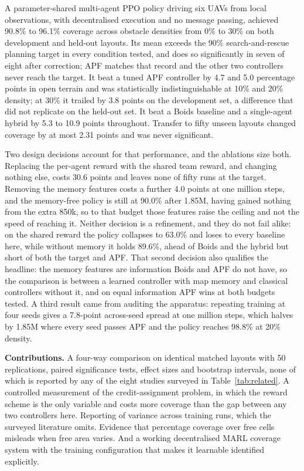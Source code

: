 \documentclass[a4paper, 10pt, conference]{ieeeconf}
\begin{document}
A parameter-shared multi-agent PPO policy driving six UAVs from local
observations, with decentralised execution and no message passing,
achieved 90.8\% to 96.1\% coverage across obstacle densities from 0\%
to 30\% on both development and held-out layouts. Its mean exceeds the
90\% search-and-rescue planning target in every condition tested, and
does so significantly in seven of eight after correction; APF matches
that record and the other two controllers never reach the target. It
beat a tuned APF controller by 4.7 and 5.0 percentage points in open
terrain and was statistically indistinguishable at 10\% and 20\%
density; at 30\% it trailed by 3.8 points on the development set, a
difference that did not replicate on the held-out set. It beat a Boids
baseline and a single-agent hybrid by 5.3 to 10.9 points throughout.
Transfer to fifty unseen layouts changed coverage by at most 2.31
points and was never significant.

Two design decisions account for that performance, and the ablations
size both. Replacing the per-agent reward with the shared team reward,
and changing nothing else, costs 30.6 points and leaves none of fifty
runs at the target. Removing the memory features costs a further 4.0
points at one million steps, and the memory-free policy is still at
90.0\% after 1.85M, having gained nothing from the extra 850k, so to
that budget those features raise the ceiling and not the speed of
reaching it. Neither decision is a refinement, and they do not fail
alike: on the shared reward the policy collapses to 63.0\% and loses
to every baseline here, while without memory it holds 89.6\%, ahead of
Boids and the hybrid but short of both the target and APF. That second
decision also qualifies the headline: the memory features are
information Boids and APF do not have, so the comparison is between a
learned controller with map memory and classical controllers without
it, and on equal information APF wins at both budgets tested. A third
result came from auditing the apparatus: repeating training at four
seeds gives a 7.8-point across-seed spread at one million steps, which
halves by 1.85M where every seed passes APF and the policy reaches
98.8\% at 20\% density.

\textbf{Contributions.} A four-way comparison on identical matched
layouts with 50 replications, paired significance tests, effect sizes
and bootstrap intervals, none of which is reported by any of the eight
studies surveyed in Table~\ref{tab:related}. A controlled measurement
of the credit-assignment problem, in which the reward scheme is the
only variable and costs more coverage than the gap between any two
controllers here. Reporting of variance across training runs, which
the surveyed literature omits. Evidence that percentage coverage over
free cells misleads when free area varies. And a working decentralised
MARL coverage system with the training configuration that makes it
learnable identified explicitly.
\end{document}
